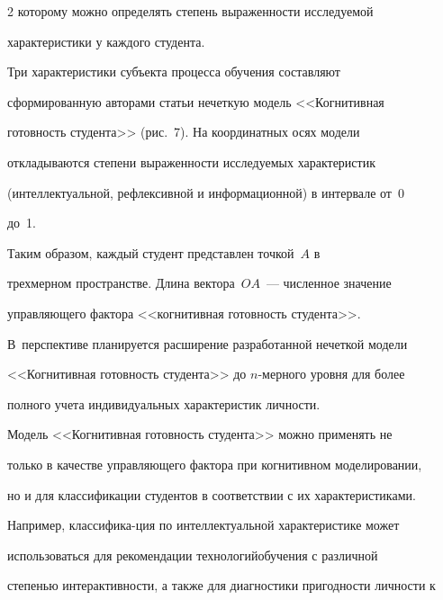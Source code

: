 \begin{multicols}{2}
которому можно определять степень выраженности исследуемой 


характеристики у каж\-до\-го студента.


     


     Три характеристики субъекта процесса обучения составляют 


сформированную авторами статьи нечеткую модель <<Когнитивная 


готовность студента>> (рис.~7). На координатных осях модели 


откладываются степени выраженности исследуемых характеристик 


(интеллектуальной, рефлексивной и информационной) в интервале от~0 


до~1. 











     Таким образом, каждый студент представлен точкой~$A$ в 


трехмерном пространстве. Длина вектора~$OA$~--- численное значение 


управляющего фактора <<когнитивная готовность студента>>. 


В~перспективе планируется расширение разработанной нечеткой модели 


<<Когнитивная готовность студента>> до $n$-мер\-но\-го уровня для более 


полного учета индивидуальных характеристик личности.








     


     Модель <<Когнитивная готовность студента>> можно применять не 


только в качестве управ\-ля\-юще\-го фактора при когнитивном моделировании, 


но и для классификации студентов в соответствии с их характеристиками. 


Например, классифика-\linebreak ция по интеллектуальной характеристике может 


использоваться для рекомендации технологий\linebreak обуче\-ния с различной 


степенью интерактивности, а также для диагностики пригодности личности к 



\end{multicols}
